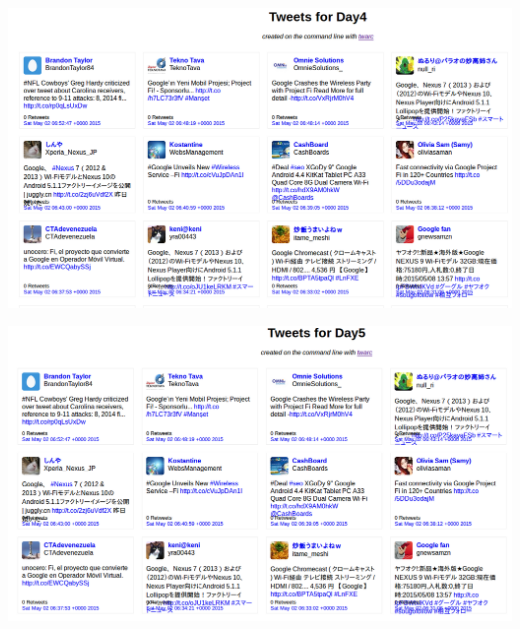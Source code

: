 	\begin{minipage}{\linewidth}
		\centering
			\includegraphics[scale=0.35]{figures/q4/wallDay4}
		\label{wordCount}
	\end{minipage}
	
	\begin{minipage}{\linewidth}
		\centering
			\includegraphics[scale=0.35]{figures/q4/wallDay5}
		\label{wordCount}
	\end{minipage}
	
